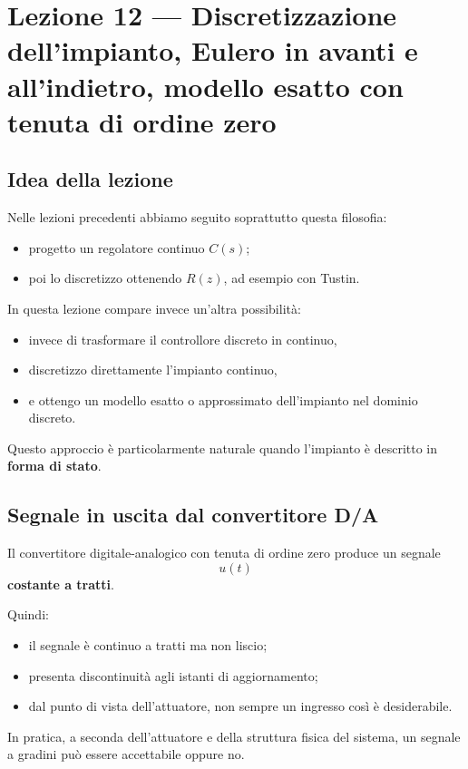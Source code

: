 \chapter{Lezione 12 --- Discretizzazione dell'impianto, Eulero in avanti e all'indietro, modello esatto con tenuta di ordine zero}

\section{Idea della lezione}

Nelle lezioni precedenti abbiamo seguito soprattutto questa filosofia:
\begin{itemize}
    \item progetto un regolatore continuo \(C(s)\);
    \item poi lo discretizzo ottenendo \(R(z)\), ad esempio con Tustin.
\end{itemize}

In questa lezione compare invece un'altra possibilit\`a:
\begin{itemize}
    \item invece di trasformare il controllore discreto in continuo,
    \item discretizzo direttamente l'impianto continuo,
    \item e ottengo un modello esatto o approssimato dell'impianto nel dominio discreto.
\end{itemize}

Questo approccio \`e particolarmente naturale quando l'impianto \`e descritto in \textbf{forma di stato}.

\section{Segnale in uscita dal convertitore D/A}

Il convertitore digitale-analogico con tenuta di ordine zero produce un segnale
\[
u(t)
\]
\textbf{costante a tratti}.

Quindi:
\begin{itemize}
    \item il segnale \`e continuo a tratti ma non liscio;
    \item presenta discontinuit\`a agli istanti di aggiornamento;
    \item dal punto di vista dell'attuatore, non sempre un ingresso cos\`i \`e desiderabile.
\end{itemize}

In pratica, a seconda dell'attuatore e della struttura fisica del sistema,
un segnale a gradini pu\`o essere accettabile oppure no.

